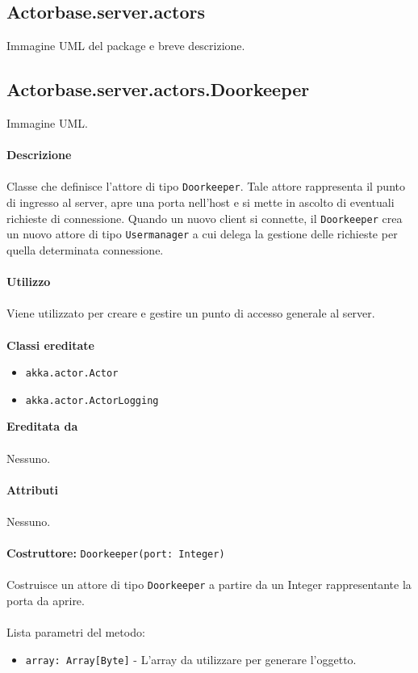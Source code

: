 \documentclass[a4paper]{article}
\begin{document}
	\subsection{Actorbase.server.actors}
		Immagine UML del package e breve descrizione.
		
	\subsection{Actorbase.server.actors.Doorkeeper}
		Immagine UML.
		\\ \\
		\textbf{Descrizione}
			\\ \\
			Classe che definisce l'attore di tipo \texttt{Doorkeeper}. Tale attore rappresenta il punto di ingresso al server, apre una porta nell'host e si mette in ascolto di eventuali richieste di connessione. Quando un nuovo client si connette, il \texttt{Doorkeeper} crea un nuovo attore di tipo \texttt{Usermanager} a cui delega la gestione delle richieste per quella determinata connessione.
			\\ \\
		\textbf{Utilizzo}
			\\ \\
			Viene utilizzato per creare e gestire un punto di accesso generale al server.
			\\ \\
		\textbf{Classi ereditate}
			\begin{itemize}
				\item \texttt{akka.actor.Actor}
				\item \texttt{akka.actor.ActorLogging}
			\end{itemize}
		\textbf{Ereditata da}
			\\ \\
			Nessuno.
			\\ \\
		\textbf{Attributi}
			\\ \\
			Nessuno.
			\\ \\
		\textbf{Costruttore: }\texttt{Doorkeeper(port: Integer)}
			\\ \\
			Costruisce un attore di tipo \texttt{Doorkeeper} a partire da un Integer rappresentante la porta da aprire.
			\\ \\
			Lista parametri del metodo:
			\begin{itemize}
				\item \texttt{array: Array[Byte]} - L'array da utilizzare per generare l'oggetto.
			\end{itemize}
\end{document}
